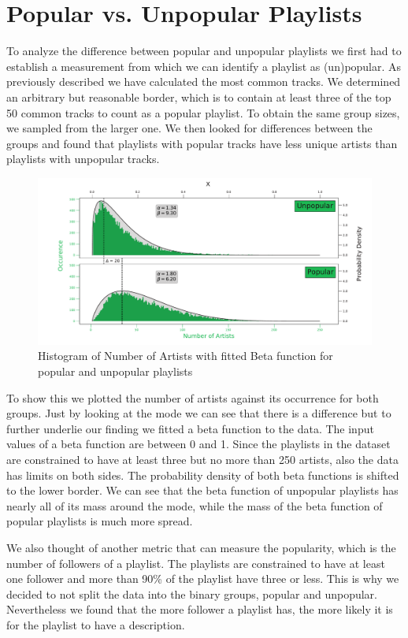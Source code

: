 \section{Popular vs. Unpopular Playlists}
To analyze the difference between popular and unpopular playlists we first had to establish a measurement from which we can identify a playlist as (un)popular. As previously described we have calculated the most common tracks. We determined an arbitrary but reasonable border, which is to contain at least three of the top 50 common tracks to count as a popular playlist. To obtain the same group sizes, we sampled from the larger one. We then looked for differences between the groups and found that playlists with popular tracks have less unique artists than playlists with unpopular tracks. 

\begin{figure}[ht]
    \centering
    \includegraphics[width=\textwidth]{fig/pop_unpop_artist.pdf}
    \caption{Histogram of Number of Artists with fitted Beta function for popular and unpopular playlists}
    \label{fig:pop_unppo_artist}
\end{figure}

To show this we plotted the number of artists against its occurrence for both groups. Just by looking at the mode we can see that there is a difference but to further underlie our finding we fitted a beta function to the data. The input values of a beta function are between 0 and 1. Since the playlists in the dataset are constrained to have at least three but no more than 250 artists, also the data has limits on both sides. The probability density of both beta functions is shifted to the lower border. We can see that the beta function of unpopular playlists has nearly all of its mass around the mode, while the mass of the beta function of popular playlists is much more spread.

We also thought of another metric that can measure the popularity, which is the number of followers of a playlist. The playlists are constrained to have at least one follower and more than 90\% of the playlist have three or less. This is why we decided to not split the data into the binary groups, popular and unpopular. Nevertheless we found that the more follower a playlist has, the more likely it is for the playlist to have a description.

